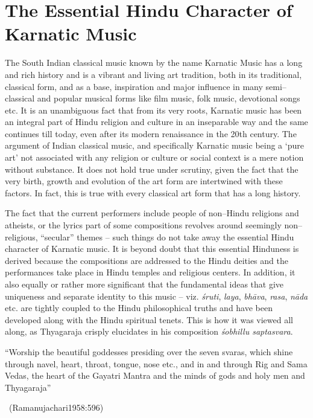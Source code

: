 \section*{The Essential Hindu Character of Karnatic Music}

The South Indian classical music known by the name Karnatic Music has a long and rich history and is a vibrant and living art tradition, both in its traditional, classical form, and as a base, inspiration and major influence in many semi–classical and popular musical forms like film music, folk music, devotional songs etc. It is an unambiguous fact that from its very roots, Karnatic music has been an integral part of Hindu religion and culture in an inseparable way and the same continues till today, even after its modern renaissance in the 20th century. The argument of Indian classical music, and specifically Karnatic music being a ‘pure art’ not associated with any religion or culture or social context is a mere notion without substance. It does not hold true under scrutiny, given the fact that the very birth, growth and evolution of the art form are intertwined with these factors. In fact, this is true with every classical art form that has a long history.

The fact that the current performers include people of non–Hindu religions and atheists, or the lyrics part of some compositions revolves around seemingly non–religious, “secular” themes – such things do not take away the essential Hindu character of Karnatic music. It is beyond doubt that this essential Hinduness is derived because the compositions are addressed to the Hindu deities and the performances take place in Hindu temples and religious centers. In addition, it also equally or rather more significant that the fundamental ideas that give uniqueness and separate identity to this music – viz. \textit{śruti}, \textit{laya}, \textit{bhāva}, \textit{rasa}, \textit{nāda} etc. are tightly coupled to the Hindu philosophical truths and have been developed along with the Hindu spiritual tenets. This is how it was viewed all along, as Thyagaraja crisply elucidates in his composition \textit{śobhillu saptasvara}.

\begin{myquote}
“Worship the beautiful goddesses presiding over the seven svaras, which shine through navel, heart, throat, tongue, nose etc., and in and through Rig and Sama Vedas, the heart of the Gayatri Mantra and the minds of gods and holy men and Thyagaraja” 

~\hfill (Ramanujachari1958:596)
\end{myquote}


